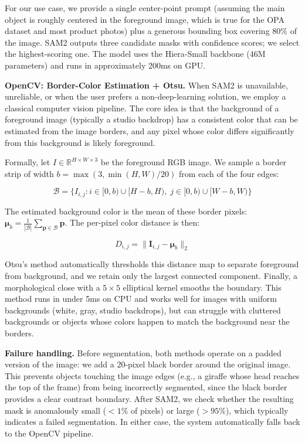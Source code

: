 \documentclass[10pt,twocolumn]{article}
\begin{document}
For our use case, we provide a single center-point prompt (assuming the main object is roughly centered in the foreground image, which is true for the OPA dataset and most product photos) plus a generous bounding box covering 80\% of the image. SAM2 outputs three candidate masks with confidence scores; we select the highest-scoring one. The model uses the Hiera-Small backbone (46M parameters) and runs in approximately 200ms on GPU.

\textbf{OpenCV: Border-Color Estimation + Otsu.} When SAM2 is unavailable, unreliable, or when the user prefers a non-deep-learning solution, we employ a classical computer vision pipeline. The core idea is that the background of a foreground image (typically a studio backdrop) has a consistent color that can be estimated from the image borders, and any pixel whose color differs significantly from this background is likely foreground.

Formally, let $I \in \mathbb{R}^{H\times W\times 3}$ be the foreground RGB image. We sample a border strip of width $b = \max(3, \min(H,W)/20)$ from each of the four edges:

\begin{equation}
\mathcal{B} = \{I_{i,j} : i \in [0,b) \cup [H-b, H), \;
                j \in [0,b) \cup [W-b, W)\}
\end{equation}

The estimated background color is the mean of these border pixels: $\bm{\mu}_b = \frac{1}{|\mathcal{B}|} \sum_{\mathbf{p} \in \mathcal{B}} \mathbf{p}$. The per-pixel color distance is then:

\begin{equation}
D_{i,j} = \|\mathbf{I}_{i,j} - \bm{\mu}_b\|_2
\end{equation}

Otsu's method automatically thresholds this distance map to separate foreground from background, and we retain only the largest connected component. Finally, a morphological close with a $5\times 5$ elliptical kernel smooths the boundary. This method runs in under 5ms on CPU and works well for images with uniform backgrounds (white, gray, studio backdrops), but can struggle with cluttered backgrounds or objects whose colors happen to match the background near the borders.

\textbf{Failure handling.} Before segmentation, both methods operate on a padded version of the image: we add a 20-pixel black border around the original image. This prevents objects touching the image edges (e.g., a giraffe whose head reaches the top of the frame) from being incorrectly segmented, since the black border provides a clear contrast boundary. After SAM2, we check whether the resulting mask is anomalously small ($<1\%$ of pixels) or large ($>95\%$), which typically indicates a failed segmentation. In either case, the system automatically falls back to the OpenCV pipeline.
\end{document}
